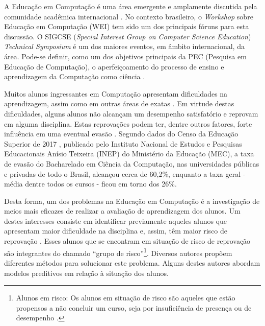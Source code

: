 \documentclass[
	12pt,				%
	openright,			%
	oneside,
	a4paper,			%
	english,			%
	french,				%
	spanish,			%
	brazil,				%
	]{abntex2}
\begin{document}




A Educação em Computação é uma área emergente e amplamente discutida pela comunidade acadêmica internacional \cite{fincher2005mapping}. No contexto brasileiro, o \textit{Workshop} sobre Educação em Computação (WEI) tem sido um dos principais fóruns para esta discussão. O SIGCSE (\textit{Special Interest Group on Computer Science Education}) \textit{Technical Symposium} é um dos maiores eventos, em âmbito internacional, da área. Pode-se definir, como um dos objetivos principais da PEC (Pesquisa em Educação de Computação), o aperfeiçoamento do processo de ensino e aprendizagem da Computação como ciência \cite{holmboe2001research}.

Muitos alunos ingressantes em Computação apresentam dificuldades na aprendizagem, assim como em outras áreas de exatas \cite{blando2015dificuldades}. Em virtude destas dificuldades, alguns alunos não alcançam um desempenho satisfatório e reprovam em alguma disciplina. Estas reprovações podem ter, dentre outros fatores, forte influência em uma eventual evasão \cite{evasaoMatheus2014}. Segundo dados do Censo da Educação Superior de 2017 \cite{Inep2017}, publicado pelo Instituto Nacional de Estudos e Pesquisas Educacionais Anísio Teixeira (INEP) do Ministério da Educação (MEC), a taxa de evasão do Bacharelado em Ciência da Computação, nas universidades públicas e privadas de todo o Brasil, alcançou cerca de 60,2\%, enquanto a taxa geral - média dentre todos os cursos - ficou em torno dos 26\%.

Desta forma, um dos problemas na Educação em Computação é a investigação de meios mais eficazes de realizar a avaliação de aprendizagem dos alunos. Um destes interesses consiste em identificar previamente aqueles alunos que apresentam maior dificuldade na disciplina e, assim, têm maior risco de reprovação \cite{martins2012assistente}. Esses alunos que se encontram em situação de risco de reprovação são integrantes do chamado ``grupo de risco''\footnote[1]{Alunos em risco: Os alunos em situação de risco são aqueles que estão propensos a não concluir um curso, seja por insuficiência de presença ou de desempenho \cite{da2014alunos}.}. Diversos autores propõem diferentes métodos para solucionar este problema. Alguns destes autores abordam modelos preditivos em relação à situação dos alunos.
\end{document}
